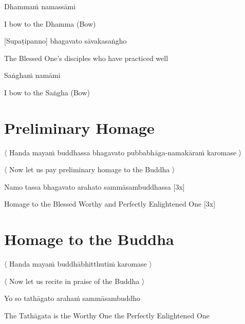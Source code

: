 Dhammaṁ namassāmi\relax

\begin{english}
  I bow to the Dhamma \hfill{(Bow)}
\end{english}

[Supaṭipanno] bhagavato sāvakasaṅgho

\begin{english}
  The Blessed One's disciples who have practiced well
\end{english}

Saṅghaṁ namāmi

\begin{english}
  I bow to the Saṅgha \hfill{(Bow)}
\end{english}

\section{Preliminary Homage}
\label{preliminary-homage}

\begin{leader}
  〈 Handa mayaṁ buddhassa bhagavato pubbabhāga-namakāraṁ karomase 〉
\end{leader}

\begin{leader-english}
  〈 Now let us pay preliminary homage to the Buddha 〉
\end{leader-english}

Namo tassa bhagavato arahato sammāsambuddhassa \hfill{[3x]}

\begin{english}
  Homage to the Blessed Worthy and Perfectly Enlightened One \hfill{[3x]}
\end{english}

\section{Homage to the Buddha}
\label{homage-buddha}

\begin{leader}
  〈 Handa mayaṁ buddhābhitthutiṁ karomase 〉
\end{leader}
\begin{leader-english}
  〈 Now let us recite in praise of the Buddha 〉
\end{leader-english}

Yo so tathāgato arahaṁ sammāsambuddho

\begin{english}
  The Tathāgata is the Worthy One the Perfectly Enlightened One
\end{english}

